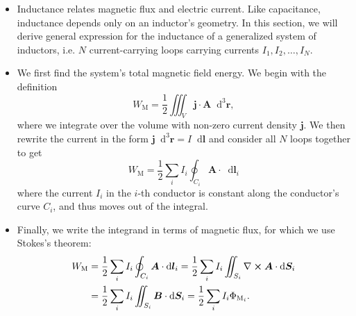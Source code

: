 \documentclass[11pt, a4paper]{article}
\newcommand{\diff}{\mathop{}\!\mathrm{d}} %
\newcommand{\dr}{\diff^{3} \r}  %
\renewcommand{\vec}[1]{\bm{#1}} %
\renewcommand{\r}{\vec{r}}
\newcommand{\B}{\vec{B}} %
\newcommand{\A}{\vec{A}} %
\renewcommand{\j}{\vec{j}}  %
\renewcommand{\curl}{\nabla \cross}
\begin{document}
\begin{itemize}
	\item Inductance relates magnetic flux and electric current. Like capacitance, inductance depends only on an inductor's geometry. In this section, we will derive general expression for the inductance of a generalized system of inductors, i.e. $ N $ current-carrying loops carrying currents $ I_{1}, I_{2}, \ldots, I_{N} $.
	
	\item We first find the system's total magnetic field energy. We begin with the definition
	\begin{equation*}
		W_{\text{M}} = \frac{1}{2}\iiint_{V}\j \cdot \A \dr,
	\end{equation*}
	where we integrate over the volume with non-zero current density $ \j $. We then rewrite the current in the form $ \j \dr = I \diff \vec{l} $ and consider all $ N $ loops together to get
	\begin{equation*}
		W_{\text{M}} = \frac{1}{2}\sum_{i}I_{i}\oint_{C_{i}} \A \cdot \diff \vec{l}_{i}
	\end{equation*}
	where the current $ I_{i} $ in the $ i $-th conductor is constant along the conductor's curve $ C_{i} $, and thus moves out of the integral.
	
	\item Finally, we write the integrand in terms of magnetic flux, for which we use Stokes's theorem:
	\begin{align*}
        W_{\text{M}} &= \frac{1}{2}\sum_{i}I_{i}\oint_{C_{i}} \A \cdot \diff \vec{l}_{i} = \frac{1}{2}\sum_{i}I_{i}\iint_{S_{i}} \curl \A \cdot \diff \vec{S}_{i} \\
        &= \frac{1}{2}\sum_{i}I_{i}\iint_{S_{i}} \B \cdot \diff \vec{S}_{i} = \frac{1}{2}\sum_{i}I_{i} \Phi_{\text{M}_{i}}.
	\end{align*}
	

\end{itemize}
\end{document}
